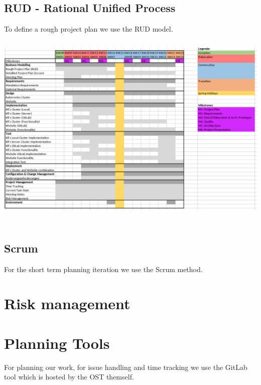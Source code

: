 \subsection{RUD - Rational Unified Process}
To define a rough project plan we use the RUD model. \newline
\includegraphics[height=10cm]{resources/project-plan-RUD.png}

\subsection{Scrum}
For the short term planning iteration we use the Scrum method.

\section{Risk management}


\section{Planning Tools}
For planning our work, for issue handling and time tracking we use the GitLab tool which is hosted by the OST themself.
